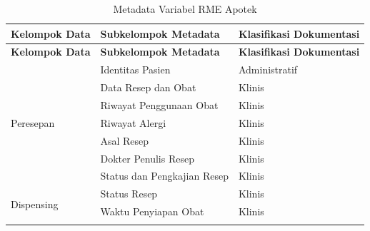 \begin{longtable}{|p{4cm}|p{5.2cm}|p{3.2cm}|}
	\caption{Metadata Variabel RME Apotek}
	\label{tab:metadata-rme-apotek}                                        \\
	\hline
	\textbf{Kelompok Data}        &
	\textbf{Subkelompok Metadata} &
	\textbf{Klasifikasi Dokumentasi}                                       \\ \hline
	\endfirsthead

	\hline
	\textbf{Kelompok Data}        &
	\textbf{Subkelompok Metadata} &
	\textbf{Klasifikasi Dokumentasi}                                       \\ \hline
	\endhead

	\multirow{7}{4cm}{Peresepan}
	                              & Identitas Pasien
	                              & Administratif                          \\ \cline{2-3}

	                              & Data Resep dan Obat
	                              & Klinis                                 \\ \cline{2-3}

	                              & Riwayat Penggunaan Obat
	                              & Klinis                                 \\ \cline{2-3}

	                              & Riwayat Alergi
	                              & Klinis                                 \\ \cline{2-3}

	                              & Asal Resep
	                              & Klinis                                 \\ \cline{2-3}

	                              & Dokter Penulis Resep
	                              & Klinis                                 \\ \cline{2-3}

	                              & Status dan Pengkajian Resep
	                              & Klinis                                 \\ \hline

	\multirow{5}{4cm}{Dispensing}
	                              & Status Resep
	                              & Klinis                                 \\ \cline{2-3}

	                              & Waktu Penyiapan Obat
	                              & Klinis                                 \\ \cline{2-3}


\end{longtable}
